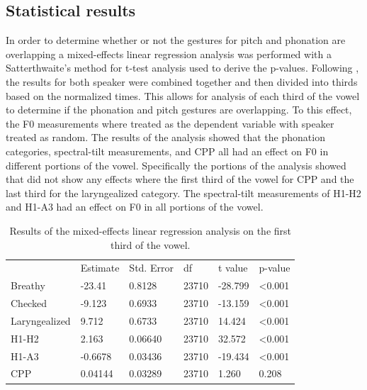 \documentclass[12pt, letterpaper]{article}
\providecommand{\lsptoprule}{\midrule\toprule}
\providecommand{\lspbottomrule}{\bottomrule\midrule}
\begin{document}
\subsection{Statistical results} \label{sec:Stats}
In order to determine whether or not the gestures for pitch and phonation are overlapping a mixed-effects linear regression analysis was performed with a Satterthwaite's method for t-test analysis used to derive the p-values. Following \citet{garellekAcousticConsequencesPhonation2011}, the results for both speaker were combined together and then divided into thirds based on the normalized times. This allows for analysis of each third of the vowel to determine if the phonation and pitch gestures are overlapping. To this effect, the F0 measurements where treated as the dependent variable with speaker treated as random. The results of the analysis showed that the phonation categories, spectral-tilt measurements, and CPP all had an effect on F0 in different portions of the vowel. Specifically the portions of the analysis showed that did not show any effects where the first third of the vowel for CPP and the last third for the laryngealized category. The spectral-tilt measurements of H1-H2 and H1-A3 had an effect on F0 in all portions of the vowel. 

\begin{table}[!h]
	\centering
	\caption{Results of the mixed-effects linear regression analysis on the first third of the vowel. }
	\label{tab:First}
	 \begin{tabular}{llllll}
	  \lsptoprule
						&  Estimate  & Std. Error & df & t value & p-value \\
	  	Breathy   		&  -23.41  	&  0.8128	& 23710 & -28.799 	& <0.001\\
		Checked    		&  -9.123  	&  0.6933	& 23710 & -13.159 	& <0.001 \\
		Laryngealized	& 9.712		& 0.6733	& 23710	& 14.424 	& <0.001 \\
		H1-H2			& 2.163		& 0.06640	& 23710	& 32.572 	& <0.001\\
		H1-A3			& -0.6678 	& 0.03436	& 23710	& -19.434	& <0.001\\
		CPP				& 0.04144	& 0.03289	& 23710	& 1.260		& 0.208\\
	  \lspbottomrule
	 \end{tabular}
\end{table}
\end{document}
